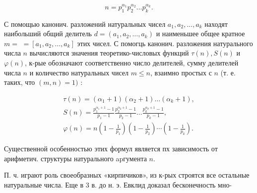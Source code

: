 \documentclass[10pt]{article}
\begin{document}
\[

n=p_{1}^{\alpha_{1}} p_{2}^{\alpha_{2}} \ldots p_{k}^{\alpha_{k}} .

\]



С помощью канонич. разложений натуральных чисел $a_{1}, a_{2}, \ldots, a_{k}$ находят наибольший общий делитель $d=\left(a_{1}, a_{2}, \ldots, a_{k}\right)$ и наименьшее общее кратное $m=$ $=\left[a_{1}, a_{2}, \ldots, a_{k}\right]$ этих чисел. С помогць канонич. разложения натурального числа $n$ вычисляются значения теоретико-числовых функций $\tau(n), S(n)$ и $\varphi(n)$, к-рые обозначают соответственно число делителей, сумму делителей числа $n$ и количество натуральных чисел $m \leqslant n$, взаимно простых с $n$ (т. е. таких, что $(m, n)=1)$ :



\[

\begin{gathered}

\tau(n)=\left(\alpha_{1}+1\right)\left(\alpha_{2}+1\right) \ldots\left(\alpha_{k}+1\right), \\

S(n)=\frac{p_{1}^{\alpha_{1}+1}-1}{p_{1}-1} \frac{p_{2}^{\alpha_{2}+1}-1}{p_{2}-1} \ldots \frac{p_{k}^{\alpha_{k}+1}-1}{p_{k}-1}, \\

\varphi(n)=n\left(1-\frac{1}{p_{1}}\right)\left(1-\frac{1}{p_{2}}\right) \cdots\left(1-\frac{1}{p_{k}}\right) .

\end{gathered}

\]



Существенной особенностью этих формул является пх зависимость от арифметич. структуры натурального apгумента $n$.



П. ч. играют роль своеобразных «кирпичиков», из к-рых строятся все остальные натуральные числа. Еще в 3 в. до н. э. Евклид доказал бесконечность мно-
\end{document}
